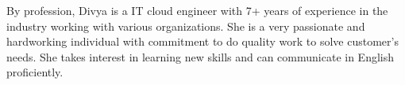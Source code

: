 

\begin{cvparagraph}

By profession, Divya is a IT cloud engineer with 7+ years of experience in the industry working with various organizations. She is a very passionate and hardworking individual with commitment to do quality work to solve customer's needs. She takes interest in learning new skills and can communicate in English proficiently.
\end{cvparagraph}
